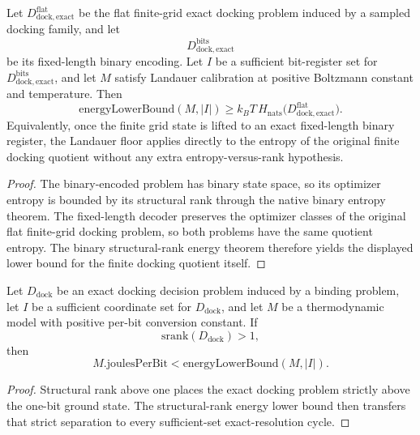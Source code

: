 \begin{theorem}\label{thm:md-energy-entropy}
Let $D^{\mathrm{flat}}_{\mathrm{dock,exact}}$ be the flat finite-grid exact docking problem induced by a sampled docking family, and let
\[
 D^{\mathrm{bits}}_{\mathrm{dock,exact}}
\]
be its fixed-length binary encoding. Let $I$ be a sufficient bit-register set for $D^{\mathrm{bits}}_{\mathrm{dock,exact}}$, and let $M$ satisfy Landauer calibration at positive Boltzmann constant and temperature. Then
\[
\mathrm{energyLowerBound}(M,|I|)
\ge
k_B T\,H_{\mathrm{nats}}\!\bigl(D^{\mathrm{flat}}_{\mathrm{dock,exact}}\bigr).
\]
Equivalently, once the finite grid state is lifted to an exact fixed-length binary register, the Landauer floor applies directly to the entropy of the original finite docking quotient without any extra entropy-versus-rank hypothesis.
\end{theorem}

\begin{proof}
The binary-encoded problem has binary state space, so its optimizer entropy is bounded by its structural rank through the native binary entropy theorem. The fixed-length decoder preserves the optimizer classes of the original flat finite-grid docking problem, so both problems have the same quotient entropy. The binary structural-rank energy theorem therefore yields the displayed lower bound for the finite docking quotient itself.
\end{proof}

\begin{theorem}\label{thm:md-above-ground}
Let $D_{\mathrm{dock}}$ be an exact docking decision problem induced by a binding problem, let $I$ be a sufficient coordinate set for $D_{\mathrm{dock}}$, and let $M$ be a thermodynamic model with positive per-bit conversion constant. If
\[
\mathrm{srank}(D_{\mathrm{dock}}) > 1,
\]
then
\[
M.\mathrm{joulesPerBit} < \mathrm{energyLowerBound}(M,|I|).
\]
\end{theorem}

\begin{proof}
Structural rank above one places the exact docking problem strictly above the one-bit ground state. The structural-rank energy lower bound then transfers that strict separation to every sufficient-set exact-resolution cycle.
\end{proof}

